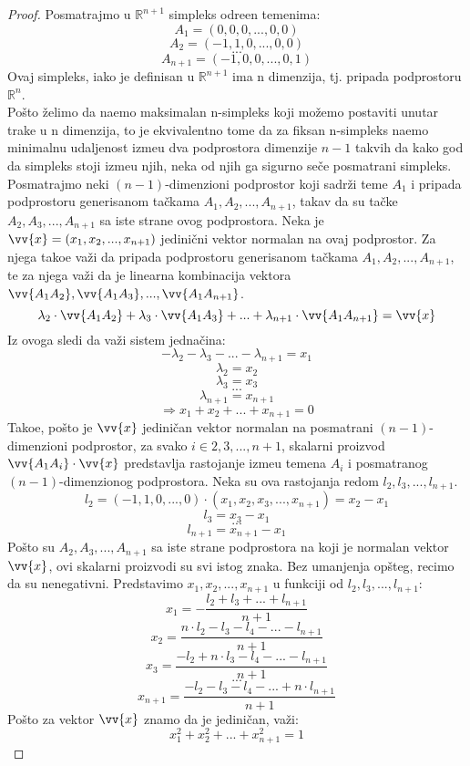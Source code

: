 \documentclass[11pt,letter]{article}
\begin{document}
\begin{proof}
Posmatrajmo u $\mathbb{R}^{n+1}$ simpleks odre\dj en temenima:
$$A_1=(0, 0, 0, ..., 0, 0)$$
$$A_2=(-1, 1, 0, ..., 0, 0)$$
$$...$$
$$A_{n+1}=(-1,0,0,..., 0, 1)$$
Ovaj simpleks, iako je definisan u $\mathbb{R}^{n+1}$ ima n dimenzija, tj. pripada podprostoru $\mathbb{R}^n$. 
 \\
\indent Po\v sto \v zelimo da na\dj emo maksimalan n-simpleks koji mo\v zemo postaviti unutar trake u n dimenzija, to je ekvivalentno tome da za fiksan n-simpleks na\dj emo minimalnu udaljenost izme\dj u dva podprostora dimenzije $n-1$ takvih da kako god da simpleks stoji izme\dj u njih, neka od njih ga sigurno se\v ce posmatrani simpleks.
\\
\indent Posmatrajmo neki $(n-1)$-dimenzioni podprostor koji sadr\v zi teme $A_1$ i pripada podprostoru generisanom ta\v ckama $A_1, A_2,..., A_{n+1}$, takav da su ta\v cke $A_2, A_3,..., A_{n+1}$ sa iste strane ovog podprostora. Neka je $\vv{x}=(x_1, x_2,..., x_{n+1})$ jedini\v cni vektor normalan na ovaj podprostor. Za njega tako\dj e va\v zi da pripada podprostoru generisanom ta\v ckama $A_1, A_2,..., A_{n+1}$, te za njega va\v zi da je linearna kombinacija vektora $\vv{A_1A_2}, \vv{A_1A_3},...,\vv{A_1 A_{n+1}}$.
$$\lambda_2 \cdot \vv{A_1A_2}+\lambda_3 \cdot \vv{A_1A_3}+...+\lambda_{n+1}\cdot \vv{A_1A_{n+1}}=\vv{x}$$
Iz ovoga sledi da va\v zi sistem jedna\v cina:
$$ -\lambda_2-\lambda_3-...-\lambda_{n+1}=x_1$$
$$\lambda_2=x_2$$
$$\lambda_3=x_3$$
$$...$$
$$\lambda_{n+1}=x_{n+1}$$
$$\Rightarrow x_1+x_2+...+x_{n+1}=0 $$
Tako\dj e, po\v sto je $\vv{x}$ jedini\v can vektor normalan na posmatrani $(n-1)$-dimenzioni podprostor, za svako $i\in {2, 3,..., n+1}$, skalarni proizvod $\vv{A_1A_i}\cdot \vv{x}$ predstavlja rastojanje izme\dj u temena $A_i$ i posmatranog $(n-1)$-dimenzionog podprostora. Neka su ova rastojanja redom $l_2, l_3,..., l_{n+1}$.
$$l_2=(-1, 1, 0,..., 0)\cdot (x_1, x_2, x_3,..., x_{n+1})=x_2-x_1$$
$$l_3=x_3-x_1$$
$$...$$
$$l_{n+1}=x_{n+1}-x_1$$
Po\v sto su $A_2, A_3,..., A_{n+1}$ sa iste strane podprostora na koji je normalan vektor $\vv{x}$, ovi skalarni proizvodi su svi istog znaka. Bez umanjenja op\v steg, recimo da su nenegativni.
Predstavimo $x_1, x_2,..., x_{n+1}$ u funkciji od $l_2, l_3,..., l_{n+1}$:
$$x_1=-\frac{l_2+l_3+...+l_{n+1}}{n+1}$$
$$x_2=\frac{n\cdot l_2-l_3-l_4-...-l_{n+1}}{n+1}$$
$$x_3=\frac{-l_2+n\cdot l_3-l_4-...-l_{n+1}}{n+1}$$
$$...$$
$$x_{n+1}=\frac{-l_2-l_3-l_4-...+n\cdot l_{n+1}}{n+1}$$
\indent Po\v sto za vektor $\vv{x}$ znamo da je jedini\v can, va\v zi:
$$x_1^2+ x_2^2+...+x_{n+1}^2=1$$

\end{proof}
\end{document}
